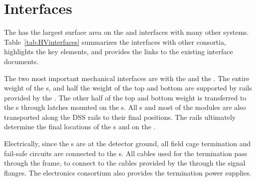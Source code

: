 \section{Interfaces }
\label{sec:fdsp-hv-intfc}


The  has the largest surface area on the  and interfaces with many other systems.  Table~\ref{tab:HVinterfaces} summarizes the interfaces with other consortia, highlights the key elements, and provides the links to the existing interface documents.

The two most important mechanical interfaces are with the  and the .  The entire weight of the s,  and half the weight of the top and bottom  are supported by rails provided by the .  The other half of the top and bottom  weight is transferred to the s through latches mounted on the s. All s and most of the  modules are also transported along the DSS rails to their final positions. The  rails ultimately determine the final locations of the s and  on the .

Electrically, since the s are at the detector ground, all  field cage termination and fail-safe circuits are connected to the s.  All cables used for the  termination pass through the  frame, to connect to the  cables provided by the  through the  signal flanges.  The  electronics consortium also provides  the  termination power supplies.

